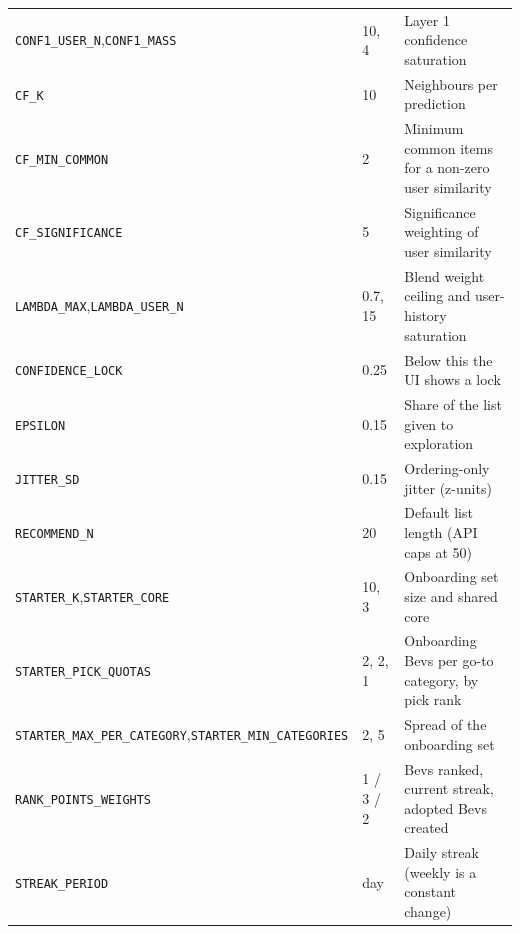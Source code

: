 \documentclass[11pt]{article}
\newcommand{\code}[1]{\texttt{#1}}
\theoremstyle{plain}
\theoremstyle{definition}
\theoremstyle{remark}
\begin{document}
\begin{center}
\begin{tabular}{@{}p{5.1cm}p{2.7cm}p{6.6cm}@{}}
\code{CONF1\_USER\_N},\newline \code{CONF1\_MASS} & 10, 4 & Layer 1 confidence saturation \\
\code{CF\_K} & 10 & Neighbours per prediction \\
\code{CF\_MIN\_COMMON} & 2 & Minimum common items for a non-zero user similarity \\
\code{CF\_SIGNIFICANCE} & 5 & Significance weighting of user similarity \\
\code{LAMBDA\_MAX},\newline \code{LAMBDA\_USER\_N} & 0.7, 15 & Blend weight ceiling and user-history saturation \\
\code{CONFIDENCE\_LOCK} & 0.25 & Below this the UI shows a lock \\
\code{EPSILON} & 0.15 & Share of the list given to exploration \\
\code{JITTER\_SD} & 0.15 & Ordering-only jitter (z-units) \\
\code{RECOMMEND\_N} & 20 & Default list length (API caps at 50) \\
\code{STARTER\_K},\newline \code{STARTER\_CORE} & 10, 3 & Onboarding set size and shared core \\
\code{STARTER\_PICK\_QUOTAS} & 2, 2, 1 & Onboarding Bevs per go-to category, by pick rank \\
\code{STARTER\_MAX\_PER\_CATEGORY},\newline \code{STARTER\_MIN\_CATEGORIES} & 2, 5 & Spread of the onboarding set \\
\code{RANK\_POINTS\_WEIGHTS} & 1 / 3 / 2 & Bevs ranked, current streak, adopted Bevs created \\
\code{STREAK\_PERIOD} & day & Daily streak (weekly is a constant change) \\
\bottomrule
\end{tabular}
\end{center}
\end{document}
